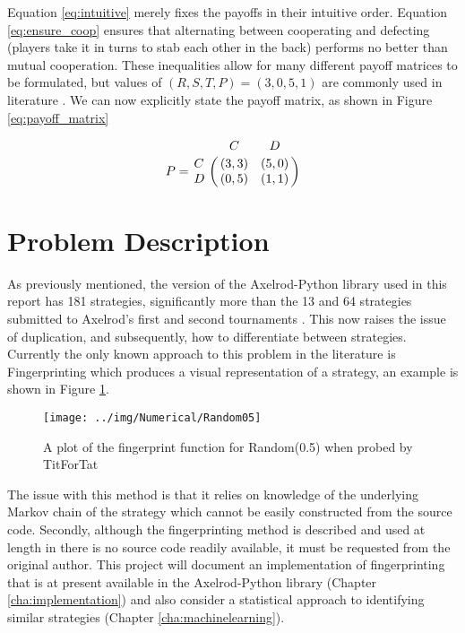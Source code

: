 Equation \ref{eq:intuitive} merely fixes the payoffs in their intuitive order.
Equation \ref{eq:ensure_coop} ensures that alternating between cooperating and defecting (players take it in turns to stab each other in the back) performs no better than mutual cooperation.
These inequalities allow for many different payoff matrices to be formulated, but values of $(R, S, T, P) = (3, 0, 5, 1)$ are commonly used in literature \cite{Axelrod1984, Axelrod1980a, Axelrod1980a}.
We can now explicitly state the payoff matrix, as shown in Figure \ref{eq:payoff_matrix}

\begin{equation}\label{eq:payoff_matrix}
%
P = \bordermatrix{~ & C & D \cr
                  C & (3, 3) & (5, 0) \cr
                  D & (0, 5) & (1, 1) \cr}
%
\end{equation}

\section{Problem Description}

As previously mentioned, the version of the Axelrod-Python library used in this report has 181 strategies, significantly more than the 13 and 64 strategies submitted to Axelrod's first and second tournaments \cite{Axelrod1980a, Axelrod1980b}.
This now raises the issue of duplication, and subsequently, how to differentiate between strategies.
Currently the only known approach to this problem in the literature is Fingerprinting which produces a visual representation of a strategy, an example is shown in Figure \ref{fig:example_fing}.

\begin{figure}[tb]
    \centering
    \texttt{[image: ../img/Numerical/Random05]}
    \caption{A plot of the fingerprint function for Random(0.5) when probed by TitForTat}
    \label{fig:example_fing}
\end{figure}

The issue with this method is that it relies on knowledge of the underlying Markov chain of the strategy which cannot be easily constructed from the source code.
Secondly, although the fingerprinting method is described and used at length in \cite{Ashlock2010, Ashlock2008, Ashlock2004, Ashlock2006, Ashlock2005, Ashlock2009} there is no source code readily available, it must be requested from the original author.
This project will document an implementation of fingerprinting that is at present available in the Axelrod-Python library (Chapter \ref{cha:implementation}) and also consider a statistical approach to identifying similar strategies (Chapter \ref{cha:machinelearning}).


